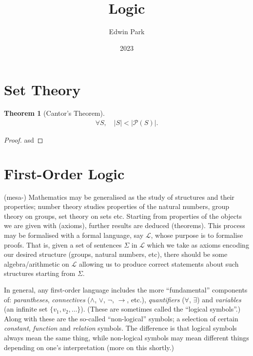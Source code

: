 \documentclass{article}
\title{Logic}
\author{Edwin Park}
\date{2023}
\newcommand{\lv}[1]{\lvert #1\rvert}
\theoremstyle{definition}
\newtheorem{thm}{Theorem}[subsubsection]
\begin{document}
\clearpage\maketitle\thispagestyle{empty} %
\newpage
\tableofcontents
\newpage\setcounter{page}{1}
\section{Set Theory}
\begin{thm}[Cantor's Theorem]
	\begin{align*}
		\forall S,\quad\lv{S}<\lv{\mathscr{P}(S)}.
	\end{align*}
\end{thm}
\begin{proof}
	asd
\end{proof}
\section{First-Order Logic}
(mesa-) Mathematics may be generalised as the study of structures and their properties; number theory studies properties of the natural numbers, group theory on groups, set theory on sets etc. Starting from properties of the objects we are given with (axioms), further results are deduced (theorems). This process may be formalised with a formal language, say $\mathcal{L}$, whose purpose is to formalise proofs. That is, given a set of sentences $\Sigma$ in $\mathcal{L}$ which we take as axioms encoding our desired structure (groups, natural numbers, etc), there should be some algebra/arithmetic on $\mathcal{L}$ allowing us to produce correct statements about such structures starting from $\Sigma$.\par

In general, any first-order language includes the more ``fundamental'' components of: \emph{parantheses}, \emph{connectives} ($\land$, $\lor$, $\neg$, $\rightarrow$, etc.), \emph{quantifiers} ($\forall$, $\exists$) and \emph{variables} (an infinite set $\{v_1,v_2,\dots\}$). (These are sometimes called the ``logical symbols''.) Along with these are the so-called ``non-logical'' symbols; a selection of certain \emph{constant}, \emph{function} and \emph{relation} symbols. The difference is that logical symbols always mean the same thing, while non-logical symbols may mean different things depending on one's interpretation (more on this shortly.)\par
\end{document}
